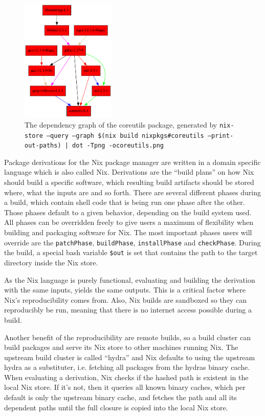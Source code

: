 \documentclass[conference,final,a4paper]{IEEEtran}
\begin{document}
\begin{figure}
    \centering
    \includegraphics[width=0.4\textwidth]{coreutils.png}
    \caption{The dependency graph of the coreutils package, generated by \texttt{nix-store --query --graph \$(nix build nixpkgs\#coreutils --print-out-paths) | dot -Tpng -ocoreutils.png}}
    \label{fig:nix-graph}
\end{figure}

Package derivations for the Nix package manager are written in a domain specific language which is also called Nix.
Derivations are the ``build plans'' on how Nix should build a specific software, which resulting build artifacts should be stored where, what the inputs are and so forth.
There are several different phases during a build, which contain shell code that is being run one phase after the other.
Those phases default to a given behavior, depending on the build system used.
All phases can be overridden freely to give users a maximum of flexibility when building and packaging software for Nix.
The most important phases users will override are the \texttt{patchPhase}, \texttt{buildPhase}, \texttt{installPhase} and \texttt{checkPhase}.
During the build, a special bash variable \texttt{\$out} is set that contains the path to the target directory inside the Nix store.

As the Nix language is purely functional, evaluating and building the derivation with the same inputs, yields the same outputs.
This is a critical factor where Nix's reproducibility comes from.
Also, Nix builds are sandboxed so they can reproducibly be run, meaning that there is no internet access possible during a build.

Another benefit of the reproducibility are remote builds, so a build cluster can build packages and serve its Nix store to other machines running Nix.
The upstream build cluster is called ``hydra'' and Nix defaults to using the upstream hydra as a substituter, i.e. fetching all packages from the hydras binary cache.
When evaluating a derivation, Nix checks if the hashed path is existent in the local Nix store.
If it's not, then it queries all known binary caches, which per default is only the upstream binary cache, and fetches the path and all its dependent paths until the full closure is copied into the local Nix store.
\end{document}

